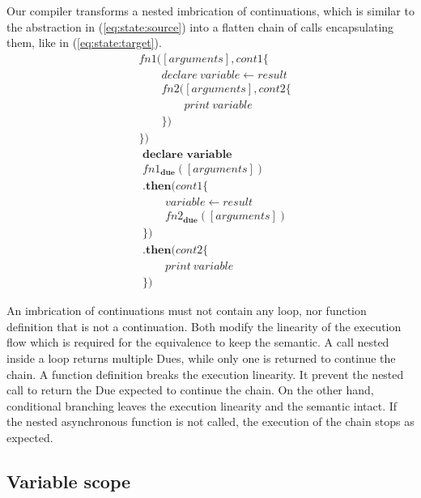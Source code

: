 Our compiler transforms a nested imbrication of continuations, which is similar to the abstraction in (\ref{eq:state:source}) into a flatten chain of calls encapsulating them, like in (\ref{eq:state:target}).
\begin{align} \label{eq:state:source}
&fn1([arguments], cont1 \{\nonumber\\
&\qquad  declare ~ variable \leftarrow result\nonumber\\
&\qquad  fn2([arguments], cont2 \{\nonumber\\
&\qquad\qquad    print ~ variable\nonumber\\
&\qquad  \})\nonumber\\
&\})
\end{align}
\begin{align} \label{eq:state:target}
&\textbf{declare variable}\nonumber\\
&fn1_\textbf{due}([arguments])\nonumber\\
&\textbf{.then}(cont1\{\nonumber\\
&\qquad  variable \leftarrow result\nonumber\\
&\qquad  fn2_\textbf{due}([arguments])\nonumber\\
&\})\nonumber\\
&\textbf{.then}(cont2\{\nonumber\\
&\qquad  print ~ variable\nonumber\\
&\})
\end{align}

An imbrication of continuations must not contain any loop, nor function definition that is not a continuation.
Both modify the linearity of the execution flow which is required for the equivalence to keep the semantic.
A call nested inside a loop returns multiple Dues, while only one is returned to continue the chain.
A function definition breaks the execution linearity.
It prevent the nested call to return the Due expected to continue the chain.
On the other hand, conditional branching leaves the execution linearity and the semantic intact.
If the nested asynchronous function is not called, the execution of the chain stops as expected.


\subsection{Variable scope}

